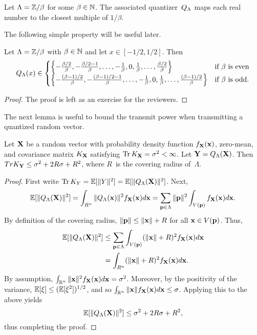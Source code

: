 \begin{example}
  Let $\Lambda = \mathbb{Z} / \beta$ for some $\beta \in {\mathbb{N}}$. The associated
  quantizer~${Q_{\Lambda}}$ maps each real number to the closest multiple of $1/\beta$.
\end{example}

The following simple property will be useful later.
\begin{proposition}
  Let $\Lambda = \mathbb{Z} / \beta$ with $\beta \in {\mathbb{N}}$ and let $x \in [-1/2, 1/2]$.
  Then
  \begin{equation*}
    {Q_{\Lambda}}(x) \in
    \begin{cases}
      \left\{ -\frac{\beta/2}{\beta}, -\frac{\beta/2 - 1}{\beta}, \dots, 
      -\frac{1}{\beta}, 0, \frac1\beta, \dots, \frac{\beta/2}{\beta} \right\}
      & \text{if $\beta$ is even} \\
      \left\{ -\frac{(\beta - 1)/2}{\beta}, -\frac{(\beta-1)/2 - 1}{\beta}, 
      \dots, -\frac1\beta, 0, \frac1\beta, \dots, \frac{(\beta-1)/2}{\beta}
      \right\}
      & \text{if $\beta$ is odd}.
    \end{cases}
  \end{equation*}
\end{proposition}

\begin{proof}
  The proof is left as an exercise for the reviewers.
\end{proof}

The next lemma is useful to bound the transmit power when transmitting a
quantized random vector.
\begin{lemma}
  \label{lem:latquantvar}
  Let $\mathbf{X}$ be a random vector with probability density function $f_{\mathbf{X}}(\mathbf{x})$,
  zero-mean, and covariance matrix $K_{\mathbf{X}}$ satisfying $\operatorname{Tr} K_{\mathbf{X}} = {\sigma^2} <
  \infty$. Let $\mathbf{Y} = {Q_{\Lambda}}(\mathbf{X})$. Then $Tr K_{\mathbf{Y}} \le {\sigma^2} + 2R\sigma + R^2$, 
  where $R$~is the covering radius of~$\Lambda$.
\end{lemma}

\begin{proof}
  First write $\operatorname{Tr} K_Y = \mathbb{E}[\|Y\|^2] = \mathbb{E}[\|{Q_{\Lambda}}(\mathbf{X})\|^2]$. Next,
  \begin{equation*}
    \mathbb{E}[\|{Q_{\Lambda}}(\mathbf{X})\|^2] = \int_{R^n} \|{Q_{\Lambda}}(\mathbf{x})\|^2 f_{\mathbf{X}}(\mathbf{x}) d\mathbf{x}
    = \sum_{\mathbf{p} \in \Lambda} \|\mathbf{p}\|^2 \int_{V(\mathbf{p})} f_{\mathbf{X}}(\mathbf{x}) d\mathbf{x}.
  \end{equation*}
  By definition of the covering radius, $\|\mathbf{p}\| \le \|\mathbf{x}\| + R$ for all $\mathbf{x} \in
  V(\mathbf{p})$. Thus,
  \begin{align*}
    \mathbb{E}[\|{Q_{\Lambda}}(\mathbf{X})\|^2] &\le \sum_{\mathbf{p} \in \Lambda} \int_{V(\mathbf{p})} (\|\mathbf{x}\| + R)^2
    f_{\mathbf{X}}(\mathbf{x}) d\mathbf{x} \\
    &= \int_{R^n} (\|\mathbf{x}\| + R)^2 f_{\mathbf{X}}(\mathbf{x}) d\mathbf{x}.
  \end{align*}
  By assumption, $\int_{\mathbb{R}^n} \|\mathbf{x}\|^2 f_{\mathbf{X}}(\mathbf{x}) d\mathbf{x} = {\sigma^2}$. Moreover, by the
  positivity of the variance, $\mathbb{E}[\xi] \le (\mathbb{E}[\xi^2])^{1/2}$, and so
  $\int_{\mathbb{R}^n} \|\mathbf{x}\| f_{\mathbf{X}}(\mathbf{x}) d\mathbf{x} \le \sigma$. Applying this to the above
  yields
  \begin{equation*}
    \mathbb{E}[\|{Q_{\Lambda}}(\mathbf{X})\|^2] \le {\sigma^2} + 2R\sigma + R^2,
  \end{equation*}
  thus completing the proof.
\end{proof}

